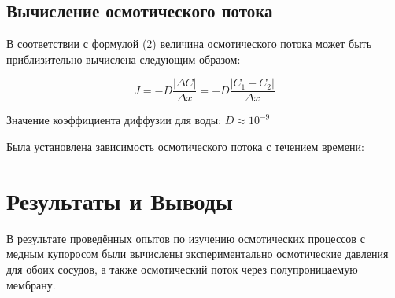 \documentclass{article}
\begin{document}
        \newpage
        \subsection*{Вычисление осмотического потока}

        В соответствии с формулой (2) величина осмотического потока может быть приблизительно вычислена следующим образом:

        \begin{equation}
            J = -D\frac{|\Delta{C}|}{\Delta{x}} = -D\frac{|C_{1} - C_{2}|}{\Delta{x}}
        \end{equation}

        \vspace*{4mm}
        Значение коэффициента диффузии для воды: $D \approx 10^{-9}$

        Была установлена зависимость осмотического потока с течением времени:
        \vspace*{4mm}


    \newpage
    \section*{Результаты и Выводы}

    \hspace*{4mm}В результате проведённых опытов по изучению осмотических процессов с медным купоросом
    были вычислены экспериментально осмотические давления для обоих сосудов, а также осмотический поток
    через полупроницаемую мембрану.
\end{document}
